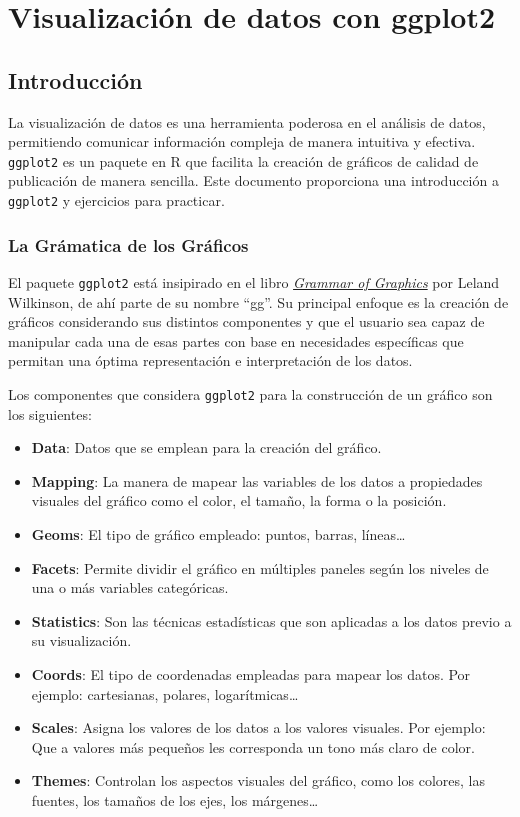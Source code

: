 \documentclass[
]{book}
\begin{document}
\section{Visualización de datos con ggplot2}\label{visualizaciuxf3n-de-datos-con-ggplot2}

\subsection{Introducción}\label{introducciuxf3n}

La visualización de datos es una herramienta poderosa en el análisis de datos, permitiendo comunicar información compleja de manera intuitiva y efectiva. \texttt{ggplot2} es un paquete en R que facilita la creación de gráficos de calidad de publicación de manera sencilla. Este documento proporciona una introducción a \texttt{ggplot2} y ejercicios para practicar.

\subsubsection{La Grámatica de los Gráficos}\label{la-gruxe1matica-de-los-gruxe1ficos}

El paquete \texttt{ggplot2} está insipirado en el libro \href{https://link.springer.com/book/10.1007/0-387-28695-0}{\emph{Grammar of Graphics}} por Leland Wilkinson, de ahí parte de su nombre ``gg''. Su principal enfoque es la creación de gráficos considerando sus distintos componentes y que el usuario sea capaz de manipular cada una de esas partes con base en necesidades específicas que permitan una óptima representación e interpretación de los datos.

Los componentes que considera \texttt{ggplot2} para la construcción de un gráfico son los siguientes:

\begin{itemize}
\item
  \textbf{Data}: Datos que se emplean para la creación del gráfico.
\item
  \textbf{Mapping}: La manera de mapear las variables de los datos a propiedades visuales del gráfico como el color, el tamaño, la forma o la posición.
\item
  \textbf{Geoms}: El tipo de gráfico empleado: puntos, barras, líneas\ldots{}
\item
  \textbf{Facets}: Permite dividir el gráfico en múltiples paneles según los niveles de una o más variables categóricas.
\item
  \textbf{Statistics}: Son las técnicas estadísticas que son aplicadas a los datos previo a su visualización.
\item
  \textbf{Coords}: El tipo de coordenadas empleadas para mapear los datos. Por ejemplo: cartesianas, polares, logarítmicas\ldots{}
\item
  \textbf{Scales}: Asigna los valores de los datos a los valores visuales. Por ejemplo: Que a valores más pequeños les corresponda un tono más claro de color.
\item
  \textbf{Themes}: Controlan los aspectos visuales del gráfico, como los colores, las fuentes, los tamaños de los ejes, los márgenes\ldots{}
\end{itemize}
\end{document}
